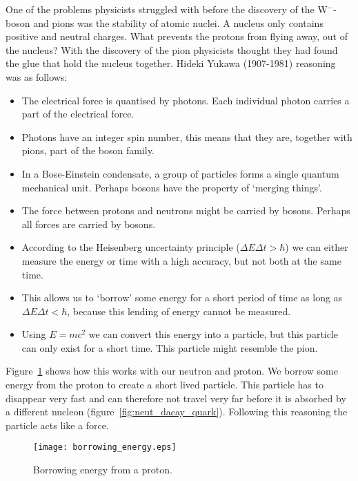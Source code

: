 One of the problems physicists struggled with before the discovery of the W$^-$-boson and pions was the stability of atomic nuclei. A nucleus only contains positive and neutral charges. What prevents the protons from flying away, out of the nucleus? With the discovery of the pion physicists thought they had found the glue that hold the nucleus together. Hideki Yukawa (1907-1981) reasoning was as follows:
\begin{itemize}
\item The electrical force is quantised by photons. Each individual photon carries a part of the electrical force.
\item Photons have an integer spin number, this means that they are, together with pions, part of the boson family.
\item In a Bose-Einstein condensate, a group of particles forms a single quantum mechanical unit. Perhaps bosons have the property of `merging things'.
\item The force between protons and neutrons might be carried by bosons. Perhaps all forces are carried by bosons.
\item According to the Heisenberg uncertainty principle ($\Delta E \Delta t > \hbar$) we can either measure the energy or time with a high accuracy, but not both at the same time.
\item This allows us to `borrow' some energy for a short period of time as long as $\Delta E \Delta t < \hbar$, because this lending of energy cannot be measured.
\item Using $E=mc^2$ we can convert this energy into a particle, but this particle can only exist for a short time. This particle might resemble the pion.
\end{itemize}

Figure~\ref{fig:borrowing_energy} shows how this works with our neutron and proton. We borrow some energy from the proton to create a short lived particle. This particle has to disappear very fast and can therefore not travel very far before it is absorbed by a different nucleon (figure~\ref{fig:neut_dacay_quark}). Following this reasoning the particle acts like a force.

\begin{figure}\begin{center}
\texttt{[image: borrowing\_energy.eps]}%
\caption{Borrowing energy from a proton.}\label{fig:borrowing_energy}
\end{center}\end{figure}

